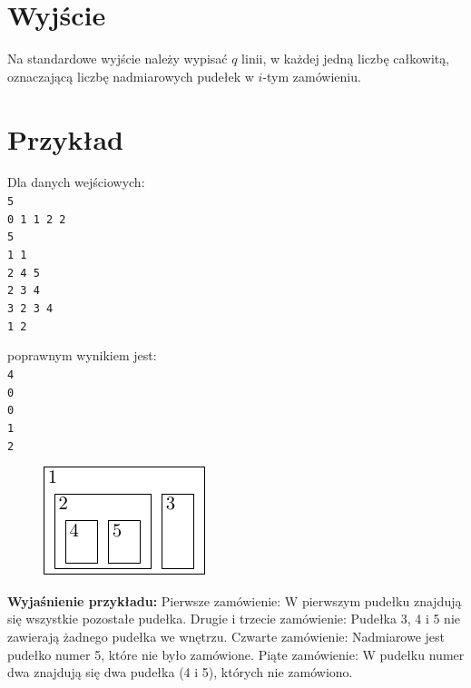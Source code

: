 \documentclass[10pt]{article}
\begin{document}

    \section*{Wyjście}
    
    Na standardowe wyjście należy wypisać $q$ linii, w każdej jedną liczbę całkowitą, oznaczającą liczbę nadmiarowych pudełek w $i$-tym zamówieniu.


    \section*{Przykład}
    
    \noindent
    \begin{minipage}[t]{0.5\textwidth}
        Dla danych wejściowych:\vspace{1ex}\\
        \texttt{5\\0 1 1 2 2\\5\\1 1\\2 4 5\\2 3 4\\3 2 3 4\\1 2}
    \end{minipage}
    \begin{minipage}[t]{0.5\textwidth}
        poprawnym wynikiem jest:\vspace{1ex}\\
        \texttt{4\\0\\0\\1\\2}       
    \end{minipage}
    
    
    \begin{figure}
        \vspace{-3ex}
        \includegraphics{pudrys-1.pdf}
    \end{figure}
    \vspace{2ex}
    \noindent\textbf{Wyjaśnienie przykładu:} Pierwsze zamówienie: W pierwszym pudełku znajdują się wszystkie pozostałe pudełka. Drugie i trzecie zamówienie: Pudełka 3, 4 i 5 nie zawierają żadnego pudełka we wnętrzu. Czwarte zamówienie: Nadmiarowe jest pudełko numer 5, które nie było zamówione. Piąte zamówienie: W pudełku numer dwa znajdują się dwa pudełka (4 i 5), których nie zamówiono.
    
\end{document}
